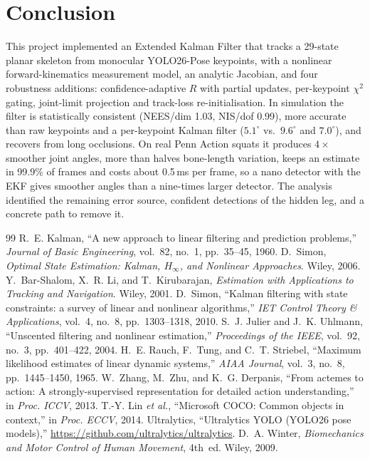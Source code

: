 \documentclass[12pt,a4paper]{article}
\begin{document}
\section{Conclusion}

This project implemented an Extended Kalman Filter that tracks a 29-state planar skeleton from monocular
YOLO26-Pose keypoints, with a nonlinear forward-kinematics measurement model, an analytic Jacobian, and four
robustness additions: confidence-adaptive $R$ with partial updates, per-keypoint $\chi^2$ gating, joint-limit
projection and track-loss re-initialisation. In simulation the filter is statistically consistent
(NEES/dim 1.03, NIS/dof 0.99), more accurate than raw keypoints and a per-keypoint Kalman filter
($5.1^\circ$ vs.\ $9.6^\circ$ and $7.0^\circ$), and recovers from long occlusions. On real Penn Action
squats it produces $4\times$ smoother joint angles, more than halves bone-length variation, keeps an
estimate in 99.9\% of frames and costs about 0.5\,ms per frame, so a nano detector with the EKF gives
smoother angles than a nine-times larger detector. The analysis identified the remaining error source,
confident detections of the hidden leg, and a concrete path to remove it.
\\
\begin{thebibliography}{99}
\small
{} R.~E. Kalman, ``A new approach to linear filtering and prediction problems,''
  \emph{Journal of Basic Engineering}, vol.~82, no.~1, pp.~35--45, 1960.
 D.~Simon, \emph{Optimal State Estimation: Kalman, $H_\infty$, and Nonlinear Approaches}.
  Wiley, 2006.
 Y.~Bar-Shalom, X.~R. Li, and T.~Kirubarajan, \emph{Estimation with Applications to
  Tracking and Navigation}. Wiley, 2001.
 D.~Simon, ``Kalman filtering with state constraints: a survey of linear and
  nonlinear algorithms,'' \emph{IET Control Theory \& Applications}, vol.~4, no.~8, pp.~1303--1318, 2010.
 S.~J. Julier and J.~K. Uhlmann, ``Unscented filtering and nonlinear estimation,''
  \emph{Proceedings of the IEEE}, vol.~92, no.~3, pp.~401--422, 2004.
 H.~E. Rauch, F.~Tung, and C.~T. Striebel, ``Maximum likelihood estimates of linear dynamic
  systems,'' \emph{AIAA Journal}, vol.~3, no.~8, pp.~1445--1450, 1965.
 W.~Zhang, M.~Zhu, and K.~G. Derpanis, ``From actemes to action: A strongly-supervised
  representation for detailed action understanding,'' in \emph{Proc. ICCV}, 2013.
 T.-Y. Lin \emph{et al.}, ``Microsoft COCO: Common objects in context,'' in
  \emph{Proc. ECCV}, 2014.
 Ultralytics, ``Ultralytics YOLO (YOLO26 pose models),''
  \url{https://github.com/ultralytics/ultralytics}.
 D.~A. Winter, \emph{Biomechanics and Motor Control of Human Movement}, 4th~ed. Wiley, 2009.
\end{thebibliography}
\end{document}
